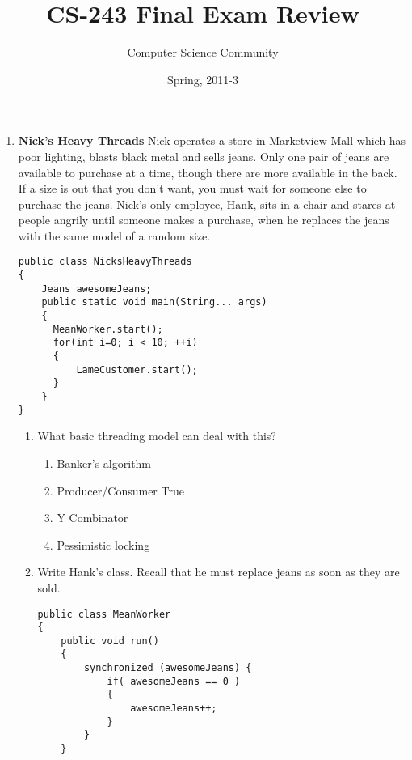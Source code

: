 \documentclass[11pt]{article}
\author{Computer Science Community}
\title{CS-243 Final Exam Review}
\date{Spring, 2011-3}
\makeatletter
\newenvironment{answer}{\large\lstset{basicstyle=\large}\color{white}}{}
\newenvironment{answer}{\large\lstset{basicstyle=\large}\color{red}}{}
\let\thetitle\@title
\let\thedate\@date
\makeatother
\begin{document}
\noindent{\Large \thetitle \hfill \thedate}

\begin{enumerate}

\item {\bf Nick's Heavy Threads} Nick operates a store in Marketview Mall which
      has poor lighting, blasts black metal and sells jeans. Only one pair of
      jeans are available to purchase at a time, though there are more
      available in the back. If a size is out that you don't want, you must
      wait for someone else to purchase the jeans. Nick's only employee, Hank,
      sits in a chair and stares at people angrily until someone makes a
      purchase, when he replaces the jeans with the same model of a random
      size.
    
\begin{lstlisting}
public class NicksHeavyThreads
{
    Jeans awesomeJeans;
    public static void main(String... args)
    {
      MeanWorker.start();
      for(int i=0; i < 10; ++i)
      {
          LameCustomer.start();
      }
    }
}
\end{lstlisting}

    \begin{enumerate}
    \item What basic threading model can deal with this?
        \begin{enumerate}
        \item Banker's algorithm    \begin{answer}~\end{answer}
        \item Producer/Consumer     \begin{answer}True\end{answer}
        \item Y Combinator          \begin{answer}~\end{answer}
        \item Pessimistic locking   \begin{answer}~\end{answer}
        \end{enumerate}
    
    \item Write Hank's class. Recall that he must replace jeans as soon as they
          are sold.

        \begin{answer}
\begin{lstlisting}
public class MeanWorker
{
    public void run()
    {
        synchronized (awesomeJeans) {
            if( awesomeJeans == 0 )
            {
                awesomeJeans++;
            }
        }
    }
\end{lstlisting}
        \end{answer}
    \end{enumerate}



\end{enumerate}
\end{document}
